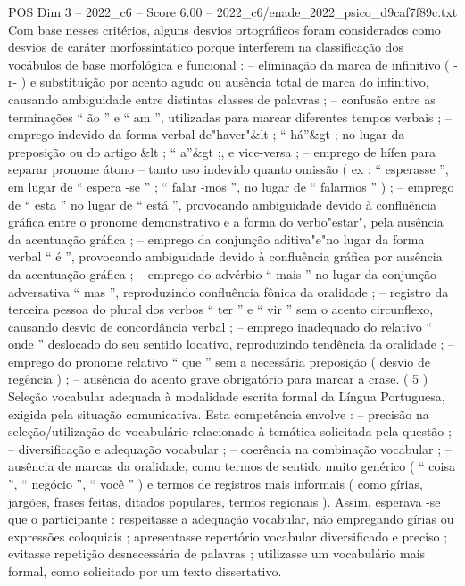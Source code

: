\begin{textsample}{POS Dim 3 – 2022\_c6 – Score 6.00 – 2022\_c6/enade\_2022\_psico\_d9caf7f89c.txt}
Com base nesses critérios, alguns desvios ortográficos foram considerados como desvios de caráter morfossintático porque interferem na classificação dos vocábulos de base morfológica e funcional : – eliminação da marca de infinitivo ( -r- ) e substituição por acento agudo ou ausência total de marca do infinitivo, causando ambiguidade entre distintas classes de palavras ; – confusão entre as terminações “ ão ” e “ am ”, utilizadas para marcar diferentes tempos verbais ; – emprego indevido da forma verbal de"haver"\&lt ; “ há”\&gt ; no lugar da preposição ou do artigo \&lt ; “ a”\&gt ;, e vice-versa ; – emprego de hífen para separar pronome átono – tanto uso indevido quanto omissão ( ex : “ esperasse ”, em lugar de “ espera -se ” ; “ falar -mos ”, no lugar de “ falarmos ” ) ; – emprego de “ esta ” no lugar de “ está ”, provocando ambiguidade devido à confluência gráfica entre o pronome demonstrativo e a forma do verbo"estar", pela ausência da acentuação gráfica ; – emprego da conjunção aditiva"e"no lugar da forma verbal “ é ”, provocando ambiguidade devido à confluência gráfica por ausência da acentuação gráfica ; – emprego do advérbio “ mais ” no lugar da conjunção adversativa “ mas ”, reproduzindo confluência fônica da oralidade ; – registro da terceira pessoa do plural dos verbos “ ter ” e “ vir ” sem o acento circunflexo, causando desvio de concordância verbal ; – emprego inadequado do relativo “ onde ” deslocado do seu sentido locativo, reproduzindo tendência da oralidade ; – emprego do pronome relativo “ que ” sem a necessária preposição ( desvio de regência ) ; – ausência do acento grave obrigatório para marcar a crase. ( 5 ) Seleção vocabular adequada à modalidade escrita formal da Língua Portuguesa, exigida pela situação comunicativa.
Esta competência envolve : – precisão na seleção/utilização do vocabulário relacionado à temática solicitada pela questão ; – diversificação e adequação vocabular ; – coerência na combinação vocabular ; – ausência de marcas da oralidade, como termos de sentido muito genérico ( “ coisa ”, “ negócio ”, “ você ” ) e termos de registros mais informais ( como gírias, jargões, frases feitas, ditados populares, termos regionais ).
Assim, esperava -se que o participante : respeitasse a adequação vocabular, não empregando gírias ou expressões coloquiais ; apresentasse repertório vocabular diversificado e preciso ; evitasse repetição desnecessária de palavras ; utilizasse um vocabulário mais formal, como solicitado por um texto dissertativo.

\end{textsample}
